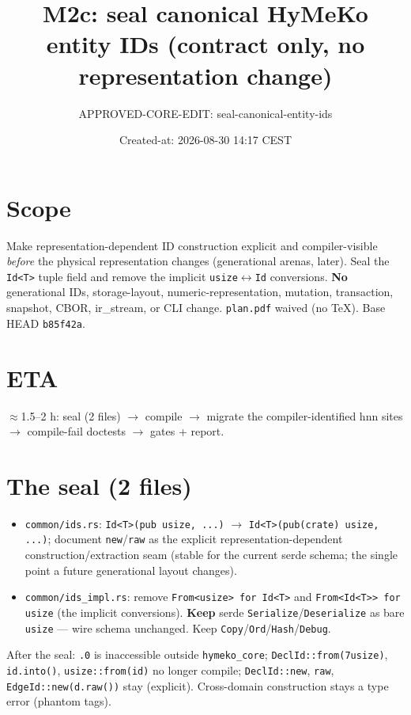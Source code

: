 \documentclass[11pt]{article}
\title{M2c: seal canonical HyMeKo entity IDs (contract only, no representation change)}
\author{APPROVED-CORE-EDIT: seal-canonical-entity-ids}
\date{Created-at: 2026-08-30 14:17 CEST}
\begin{document}
\maketitle
\section*{Scope}
Make representation-dependent ID construction explicit and compiler-visible
\emph{before} the physical representation changes (generational arenas, later).
Seal the \texttt{Id<T>} tuple field and remove the implicit \texttt{usize}$\leftrightarrow$\texttt{Id}
conversions. \textbf{No} generational IDs, storage-layout, numeric-representation,
mutation, transaction, snapshot, CBOR, ir\_stream, or CLI change. \texttt{plan.pdf}
waived (no TeX). Base HEAD \texttt{b85f42a}.
\section{ETA} $\approx$1.5--2 h: seal (2 files) $\to$ compile $\to$ migrate the
compiler-identified hnn sites $\to$ compile-fail doctests $\to$ gates + report.
\section{The seal (2 files)}
\begin{itemize}
\item \texttt{common/ids.rs}: \texttt{Id<T>(pub usize, ...)} $\to$
  \texttt{Id<T>(pub(crate) usize, ...)}; document \texttt{new}/\texttt{raw} as the
  explicit representation-dependent construction/extraction seam (stable for the
  current serde schema; the single point a future generational layout changes).
\item \texttt{common/ids\_impl.rs}: remove \texttt{From<usize> for Id<T>} and
  \texttt{From<Id<T>> for usize} (the implicit conversions). \textbf{Keep} serde
  \texttt{Serialize}/\texttt{Deserialize} as bare \texttt{usize} --- wire schema
  unchanged. Keep \texttt{Copy}/\texttt{Ord}/\texttt{Hash}/\texttt{Debug}.
\end{itemize}
After the seal: \texttt{.0} is inaccessible outside \texttt{hymeko\_core};
\texttt{DeclId::from(7usize)}, \texttt{id.into()}, \texttt{usize::from(id)} no
longer compile; \texttt{DeclId::new}, \texttt{raw}, \texttt{EdgeId::new(d.raw())}
stay (explicit). Cross-domain construction stays a type error (phantom tags).
\end{document}
